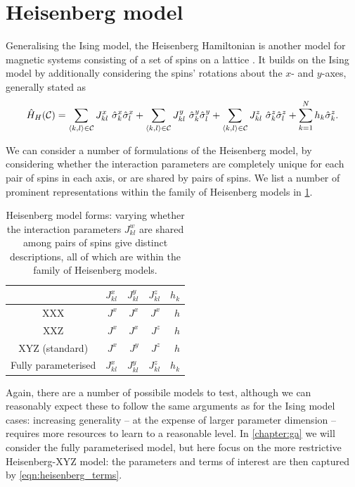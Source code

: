 \section{Heisenberg model}\label{sec:heisenberg}
Generalising the Ising model, the Heisenberg Hamiltonian is another model for magnetic systems consisting of a set of 
    spins on a lattice \cite{greiner2012thermodynamics}. 
It builds on the Ising model by additionally considering the spins' rotations about the $x$- and $y$-axes, generally stated as 
\begin{equation}
    \label{eqn:heisenberg_model_general}
    \hat{H}_H({ \mathcal{C}}) = 
    \sum\limits_{{ \langle k, l \rangle } \in { \mathcal{C}}} J^x_{kl} \  \hat{\sigma}^x_k \hat{\sigma}^x_l
    + \sum\limits_{{ \langle k, l \rangle } \in { \mathcal{C}}} J^y_{kl} \ \hat{\sigma}^y_k \hat{\sigma}^y_l
    + \sum\limits_{{ \langle k, l \rangle } \in { \mathcal{C}}} J^z_{kl} \ \hat{\sigma}^z_k \hat{\sigma}^z_l
    + \sum\limits_{k=1}^{N} h_k \hat{\sigma}^z_k.
\end{equation}

We can consider a number of formulations of the Heisenberg model, by considering whether the interaction
    parameters are completely unique for each pair of spins in each axis, 
    or  are shared by pairs of spins.
We list a number of prominent representations within the family of Heisenberg models in \cref{table:heisenberg_models}. 
\begin{table}[H]
    \begin{center}
        \begin{tabular}{crrrr}
             & $J^{x}_{kl}$ & $J^{y}_{kl}$ & $J^{z}_{kl}$ & $h_{k}$ \\
            \hline
            XXX & $J^x$ & $J^x$ & $J^x$ & $h$ \\
            XXZ & $J^x$ & $J^x$ & $J^z$ & $h$ \\
            XYZ (standard) & $J^x$ & $J^y$ & $J^z$ & $h$ \\
            Fully parameterised & $J^x_{kl}$ & $J^y_{kl}$ & $J^z_{kl}$ & $h_k$ \\
            
        \end{tabular}
    \end{center}
    \caption[Forms of Heisenberg model]{
        Heisenberg model forms: varying whether the interaction parameters $J^{w}_{kl}$ are shared among pairs of spins
        give distinct descriptions, all of which are within the family of Heisenberg models. 
    }
    \label{table:heisenberg_models}
\end{table}

Again, there are a number of possibile models to test, 
    although we can reasonably expect these to follow the same arguments as for the Ising model cases: 
    increasing generality -- at the expense of larger parameter dimension -- 
    requires more resources to learn to a reasonable level.    
In \cref{chapter:ga} we will consider the fully parameterised model, 
    but here focus on the more restrictive Heisenberg-XYZ model:
    the parameters and terms of interest are then captured by \cref{eqn:heisenberg_terms}.

